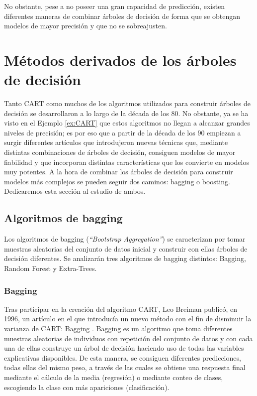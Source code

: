 \documentclass[12pt,twoside]{article}
\begin{document}
No obstante, pese a no poseer una gran capacidad de predicción, existen diferentes maneras de combinar árboles de decisión de forma que se obtengan modelos de mayor precisión y que no se sobreajusten.




\newpage
\section{Métodos derivados de los árboles de decisión}
Tanto CART como muchos de los algoritmos utilizados para construir árboles de decisión se desarrollaron a lo largo de la década de los 80. No obstante, ya se ha visto en el Ejemplo \ref{ex:CART} que estos algoritmos no llegan a alcanzar grandes niveles de precisión; es por eso que a partir de la década de los 90 empiezan a surgir diferentes artículos que introdujeron nuevas técnicas que, mediante distintas combinaciones de árboles de decisión, consiguen modelos de mayor fiabilidad y que incorporan distintas características que los convierte en modelos muy potentes. A la hora de combinar los árboles de decisión para construir modelos más complejos se pueden seguir dos caminos: bagging o boosting. Dedicaremos esta sección al estudio de ambos.


\subsection{Algoritmos de bagging}

Los algoritmos de bagging (\textit{``Bootstrap Aggregation''}) se caracterizan por tomar muestras aleatorias del conjunto de datos inicial y construir con ellas árboles de decisión diferentes. Se analizarán tres algoritmos de bagging distintos: Bagging, Random Forest y Extra-Trees.


\subsubsection{Bagging}
Tras participar en la creación del algoritmo CART, Leo Breiman publicó, en 1996, un artículo en el que introducía un nuevo método con el fin de disminuir la varianza de CART: Bagging \cite{BR01}. Bagging es un algoritmo que toma diferentes muestras aleatorias de individuos con repetición del conjunto de datos y con cada una de ellas construye un árbol de decisión haciendo uso de todas las variables explicativas disponibles. De esta manera, se consiguen diferentes predicciones, todas ellas del mismo peso, a través de las cuales se obtiene una respuesta final mediante el cálculo de la media (regresión) o mediante conteo de clases, escogiendo la clase con más apariciones (clasificación).
\end{document}
